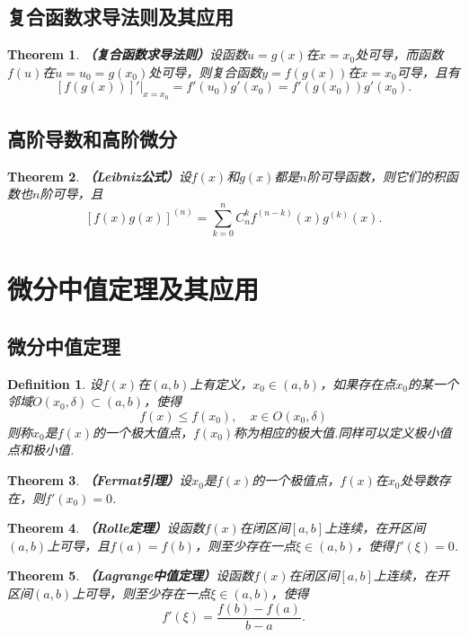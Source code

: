 \documentclass[9pt]{ctexart}
\newtheorem{definition}{Definition}[section]
\newtheorem{theorem}{Theorem}[section]
\begin{document}
\subsection{复合函数求导法则及其应用}
\begin{theorem}
    \textbf{（复合函数求导法则）}设函数$u=g(x)$在$x=x_0$处可导，而函数$f(u)$在$u=u_0=g(x_0)$处可导，则复合函数$y=f(g(x))$在$x=x_0$可导，且有
    \[[f(g(x))]'|_{x=x_0}=f'(u_0)g'(x_0)=f'(g(x_0))g'(x_0).\]
\end{theorem}
\subsection{高阶导数和高阶微分}
\begin{theorem}
    \textbf{（Leibniz公式）}设$f(x)$和$g(x)$都是$n$阶可导函数，则它们的积函数也$n$阶可导，且
    \[[f(x)g(x)]^{(n)}=\sum_{k=0}^n C_n^kf^{(n-k)}(x)g^{(k)}(x).\]
\end{theorem}
\section{微分中值定理及其应用}
\subsection{微分中值定理}
\begin{definition}
    设$f(x)$在$(a,b)$上有定义，$x_0\in(a,b)$，如果存在点$x_0$的某一个邻域$O(x_0,\delta)\subset(a,b)$，使得\[f(x)\leq f(x_0),\quad x\in O(x_0,\delta)\]
    则称$x_0$是$f(x)$的一个极大值点，$f(x_0)$称为相应的极大值.同样可以定义极小值点和极小值.
\end{definition}

\begin{theorem}
    \textbf{（Fermat引理）}设$x_0$是$f(x)$的一个极值点，$f(x)$在$x_0$处导数存在，则$f'(x_0)=0$.
\end{theorem}

\begin{theorem}
    \textbf{（Rolle定理）}设函数$f(x)$在闭区间$[a,b]$上连续，在开区间$(a,b)$上可导，且$f(a)=f(b)$，则至少存在一点$\xi\in(a,b)$，使得$f'(\xi)=0$.
\end{theorem}

\begin{theorem}
    \textbf{（Lagrange中值定理）}设函数$f(x)$在闭区间$[a,b]$上连续，在开区间$(a,b)$上可导，则至少存在一点$\xi\in(a,b)$，使得
    \[f'(\xi)=\frac{f(b)-f(a)}{b-a}.\]
\end{theorem}
\end{document}
